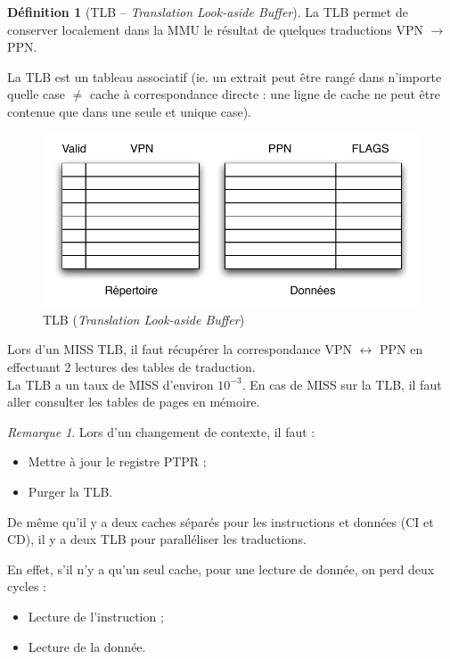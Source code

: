 \documentclass[11pt,english,french]{scrreprt}
\theoremstyle{remark}
\newtheorem*{rem*}{Remarque}
\theoremstyle{definition}
\newtheorem*{def*}{Définition}
\begin{document}
\begin{def*}[TLB -- \emph{Translation Look-aside Buffer}]
	La TLB permet de conserver localement dans la MMU le résultat de quelques traductions VPN $\rightarrow$ PPN.
	
	La TLB est un tableau associatif (ie. un extrait peut être rangé dans n'importe quelle case $\neq$ cache à correspondance directe : une ligne de cache ne peut être contenue que dans une seule et unique case).
	\begin{figure}[!h]
		\center
		\includegraphics[scale=.60]{diagrammes/TLB}
		\caption{TLB (\emph{Translation Look-aside Buffer})}
	\end{figure}
\end{def*}

Lors d'un MISS TLB, il faut récupérer la correspondance VPN $\leftrightarrow$ PPN en effectuant 2 lectures des tables de traduction.\\
La TLB a un taux de MISS d'environ $10^{-3}$. En cas de MISS sur la TLB, il faut aller consulter les tables de pages en mémoire.

\begin{rem*}
	Lors d'un changement de contexte, il faut :\begin{itemize}
		\item Mettre à jour le registre PTPR ;
		\item Purger la TLB.
	\end{itemize}
	De même qu'il y a deux caches séparés pour les instructions et données (CI et CD), il y a deux TLB pour paralléliser les traductions.
	
	En effet, s'il n'y a qu'un seul cache, pour une lecture de donnée, on perd deux cycles : \begin{itemize}
		\item Lecture de l'instruction ;
		\item Lecture de la donnée.
	\end{itemize}
\end{rem*}
\end{document}
